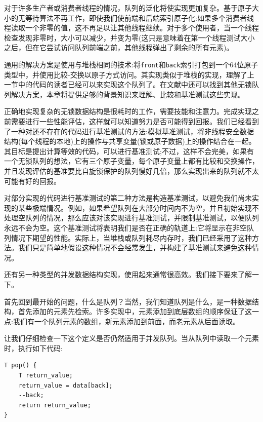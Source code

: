 对于许多生产者或消费者线程的情况，队列的泛化将使实现更加复杂。基于原子大小的无等待算法不再工作，即使我们使前端和后端索引原子化:如果多个消费者线程读取一个非零的值，这不再足以让其他线程继续。对于多个使用者，当一个线程检查发现非零时，大小可以减少，并变为零(这只是意味着在第一个线程测试大小之后，但在它尝试访问队列前端之前，其他线程弹出了剩余的所有元素)。

通用的解决方案是使用与堆栈相同的技术:将\texttt{front}和\texttt{back}索引打包到一个64位原子类型中，并使用比较-交换以原子方式访问。其实现类似于堆栈的实现，理解了上一节中的代码的读者已经可以来实现这个队列了。在文献中还可以找到其他无锁队列解决方案，本章将提供足够的背景知识来理解、比较和基准测试这些实现。

正确地实现复杂的无锁数据结构是很耗时的工作，需要技能和注意力。完成实现之前需要进行一些性能评估，这样就可以知道努力是否可能得到回报。我们已经看到了一种对还不存在的代码进行基准测试的方法:模拟基准测试，将非线程安全数据结构(每个线程的本地)上的操作与共享变量(锁或原子数据)上的操作结合在一起。其目标是提出计算等效的代码，可以进行基准测试;不过，这样不会完美，如果有一个无锁队列的想法，它有三个原子变量，每个原子变量上都有比较和交换操作，并且发现评估的基准要比自旋锁保护的队列慢好几倍，那么实现出来的队列就不太可能有好的回报。

对部分实现的代码进行基准测试的第二种方法是构造基准测试，以避免我们尚未实现的某些极端情况。例如，如果希望队列在大部分时间内不为空，并且初始实现不处理空队列的情况，那么应该对该实现进行基准测试，并限制基准测试，以便队列永远不会为空。这个基准测试将表明我们是否在正确的轨道上:它将显示在非空队列情况下期望的性能。实际上，当堆栈或队列耗尽内存时，我们已经采用了这种方法。我们只是简单地假设这种情况不会经常发生，并构建了基准测试来避免这种情况。

还有另一种类型的并发数据结构实现，使用起来通常很高效。我们接下要来了解一下。


首先回到最开始的问题，什么是队列？当然，我们知道队列是什么，是一种数据结构，首先添加的元素先检索。许多实现中，元素添加到底层数组的顺序保证了这一点:我们有一个队列元素的数组，新元素添加到前面，而老元素从后面读取。

让我们仔细检查一下这个定义是否仍然适用于并发队列。当从队列中读取一个元素时，执行如下代码:

\begin{lstlisting}[style=styleCXX]
T pop() {
	T return_value;
	return_value = data[back];
	--back;
	return return_value;
}
\end{lstlisting}

